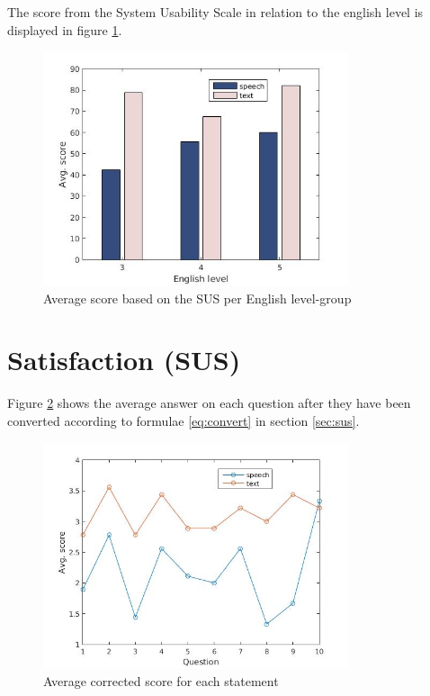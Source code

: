 The score from the System Usability Scale in relation to the english level is displayed in figure \ref{eng_score}.
\begin{figure}[ht]
  \centering
  \includegraphics[width=0.8\textwidth]{images/english_score.jpg}
  \caption{Average score based on the SUS per English level-group}\label{eng_score}
\end{figure}


\section{Satisfaction (SUS)}
Figure \ref{fig:sus_table} shows the average answer on each question after they have been converted according to formulae \ref{eq:convert} in section \ref{sec:sus}. 
\begin{figure}[ht]
  \centering
  \includegraphics[width=0.8\textwidth]{images/sus.jpg}
  \caption{Average corrected score for each statement}\label{fig:sus_table}
\end{figure}

